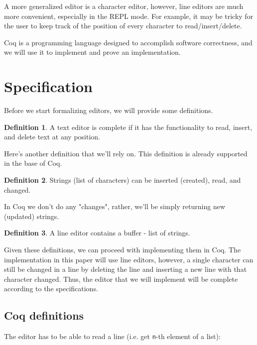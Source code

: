 \documentclass{article}
\theoremstyle{definition}
\newtheorem{definition}{Definition}[section]
\begin{document}
A more generalized editor is a character editor, however, line editors are much more convenient, especially in the REPL mode. For example, it may be tricky for the user to keep track of the position of every character to read/insert/delete.

Coq \cite{b2} is a programming language designed to accomplish software correctness, and we will use it to implement and prove an implementation.

\section{Specification}

Before we start formalizing editors, we will provide some definitions.

\theoremstyle{definition}
\begin{definition}
A text editor is complete if it has the functionality to read, insert, and delete text at any position.
\end{definition}

Here's another definition that we'll rely on. This definition is already supported in the base of Coq.

\theoremstyle{definition}
\begin{definition}
Strings (list of characters) can be inserted (created), read, and changed.
\end{definition}

In Coq we don't do any "changes", rather, we'll be simply returning new (updated) strings.

\theoremstyle{definition}
\begin{definition}
A line editor contains a buffer - list of strings.
\end{definition}

Given these definitions, we can proceed with implementing them in Coq. The implementation in this paper will use line editors, however, a single character can still be changed in a line by deleting the line and inserting a new line with that character changed. Thus, the editor that we will implement will be complete according to the specifications.

\subsection{Coq definitions}

The editor has to be able to read a line (i.e. get \texttt{n}-th element of a list):
\end{document}
